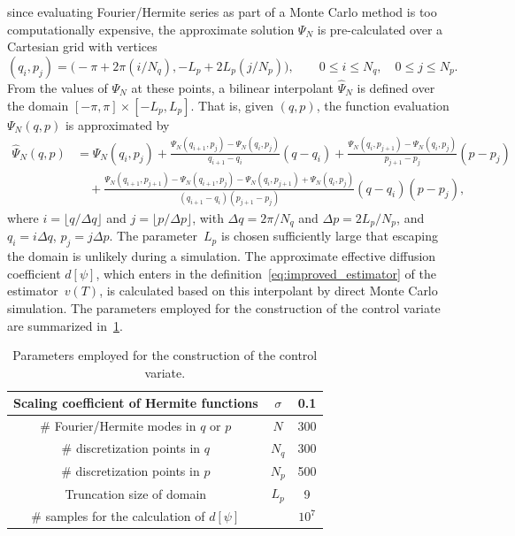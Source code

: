 \documentclass[11pt,a4paper]{article}
\theoremstyle{plain}
\numberwithin{equation}{section}
\renewcommand{\leq}{\leqslant}
\begin{document}
since evaluating Fourier/Hermite series as part of a Monte Carlo method is too computationally expensive,
the approximate solution $\Psi_N$ is pre-calculated over a Cartesian grid with vertices
\[
    (q_i, p_j) = \bigl(- \pi + 2\pi(i/N_q) , - L_p + 2L_p (j/N_p) \bigr), \qquad 0 \leq i \leq N_q, \quad 0 \leq j \leq N_p.
\]
From the values of $\Psi_N$ at these points,
a bilinear interpolant $\widehat \Psi_N$ is defined over the domain $[-\pi, \pi] \times [-L_p, L_p]$.
That is, given $(q, p)$, the function evaluation $\Psi_N(q, p)$ is approximated by
\begin{align*}
    \widehat \Psi_N(q, p)
    &= \Psi_N(q_i,p_j) + \frac{\Psi_N(q_{i+1}, p_j) - \Psi_N(q_i, p_j)}{q_{i+1} - q_i} (q - q_i)
    +\frac{\Psi_N(q_{i}, p_{j+1}) - \Psi_N(q_{i}, p_{j})}{p_{j+1} - p_j} (p - p_j) \\
    &\quad + \frac{\Psi_N(q_{i+1}, p_{j+1}) - \Psi_N(q_{i+1}, p_{j}) - \Psi_N(q_{i}, p_{j+1}) + \Psi_N(q_{i}, p_{j})}{(q_{i+1} - q_i)(p_{j+1} - p_j)}  (q-q_i)(p-p_j),
\end{align*}
where $i = \lfloor q / \Delta q \rfloor$ and $j = \lfloor p / \Delta p \rfloor$,
with $\Delta q = 2\pi/N_q$ and $\Delta p = 2L_p/N_p$, and $q_i = i \Delta q$, $p_j = j \Delta p$.
The parameter~$L_p$ is chosen sufficiently large that escaping the domain is unlikely during a simulation.
The approximate effective diffusion coefficient $d[\psi]$,
which enters in the definition~\eqref{eq:improved_estimator} of the estimator~$v(T)$,
is calculated based on this interpolant by direct Monte Carlo simulation.
The parameters employed for the construction of the control variate are summarized in~\cref{table:parameters_employed_for_the_construction_of_the_control_variate}.
\begin{table}[ht]
    \centering
    \begin{tabular}{|c|c|c|}
        \hline
        Scaling coefficient of Hermite functions & $\sigma$ & 0.1 \\
        \hline
        \# Fourier/Hermite modes in $q$ or $p$ & $N$ & 300 \\
        \hline
        \# discretization points in $q$ & $N_q$ & 300 \\
        \hline
        \# discretization points in $p$ & $N_p$ & 500 \\
        \hline
        Truncation size of domain & $L_p$ & 9 \\
        \hline
        \# samples for the calculation of $d[\psi]$ & & $10^7$ \\
        \hline
    \end{tabular}
    \caption{Parameters employed for the construction of the control variate.}
    \label{table:parameters_employed_for_the_construction_of_the_control_variate}
\end{table}
\end{document}
